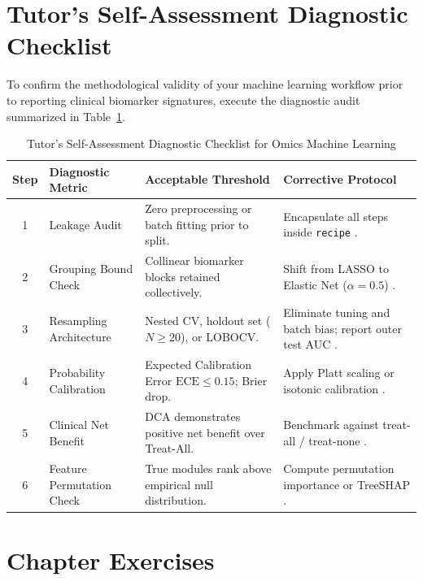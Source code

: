 \documentclass[11pt,oneside]{book}
\begin{document}
\clearpage

\section{Tutor's Self-Assessment Diagnostic Checklist}

To confirm the methodological validity of your machine learning workflow prior to reporting clinical biomarker signatures, execute the diagnostic audit summarized in Table~\ref{tab:ml_checklist}.

\begin{table}[ht]
\centering
\caption{Tutor's Self-Assessment Diagnostic Checklist for Omics Machine Learning}
\label{tab:ml_checklist}
\small
\begin{tabularx}{\textwidth}{c p{4.0cm} p{4.6cm} X}
\toprule
\textbf{Step} & \textbf{Diagnostic Metric} & \textbf{Acceptable Threshold} & \textbf{Corrective Protocol} \\
\midrule
1 & Leakage Audit & Zero preprocessing or batch fitting prior to split. & Encapsulate all steps inside \texttt{recipe} \cite{kuhn2022tidymodels}. \\
2 & Grouping Bound Check & Collinear biomarker blocks retained collectively. & Shift from LASSO to Elastic Net ($\alpha=0.5$) \cite{zou2005regularization}. \\
3 & Resampling Architecture & Nested CV, holdout set ($N \ge 20$), or LOBOCV. & Eliminate tuning and batch bias; report outer test AUC \cite{kuhn2013applied}. \\
4 & Probability Calibration & Expected Calibration Error $\text{ECE} \le 0.15$; Brier drop. & Apply Platt scaling or isotonic calibration \cite{platt1999probabilistic}. \\
5 & Clinical Net Benefit & DCA demonstrates positive net benefit over Treat-All. & Benchmark against treat-all / treat-none \cite{vickers2006decision}. \\
6 & Feature Permutation Check & True modules rank above empirical null distribution. & Compute permutation importance or TreeSHAP \cite{lundberg2020local}. \\
\bottomrule
\end{tabularx}
\end{table}

\section{Chapter Exercises}
\end{document}
